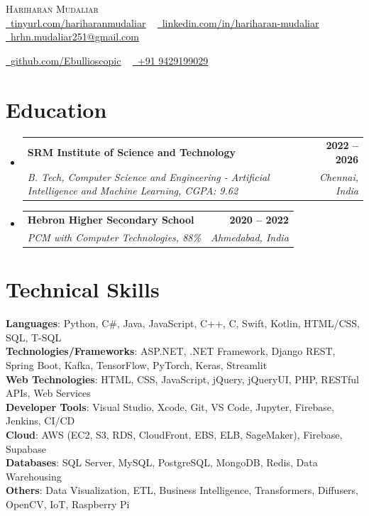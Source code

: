 \documentclass[letterpaper,11pt]{article}
\makeatletter
\newcommand{\resumeSubheading}[4]{
  \vspace{-2pt}\item
    \begin{tabular*}{1.0\textwidth}[t]{l@{\extracolsep{\fill}}r}
      \textbf{#1} & \textbf{\small #2} \\
      \textit{\small#3} & \textit{\small #4} \\
    \end{tabular*}\vspace{-7pt}
}
\newcommand{\resumeSubHeadingListStart}{\begin{itemize}[leftmargin=0.0in, label={}]}
\newcommand{\resumeSubHeadingListEnd}{\end{itemize}}
\makeatother
\begin{document}
\begin{center}
    {\Huge \scshape Hariharan Mudaliar} \\ \vspace{1pt}
    \href{https://tinyurl.com/hariharanmudaliar}{\raisebox{-0.2\height}\faLink\ \underline{tinyurl.com/hariharanmudaliar}} ~
    \href{https://linkedin.com/in/hariharan-mudaliar}{\raisebox{-0.2\height}\faLinkedin\ \underline{linkedin.com/in/hariharan-mudaliar}} ~
    \href{mailto:hrhn.mudaliar251@gmail.com}{\raisebox{-0.2\height}\faEnvelope\ \underline{hrhn.mudaliar251@gmail.com}} ~
    
    \href{https://github.com/Ebullioscopic}{\raisebox{-0.2\height}\faGithub\ \underline{github.com/Ebullioscopic}} ~
    \href{tel:+919429199029}{\raisebox{-0.2\height}\faPhone\ +91 9429199029}
\end{center}

\section{Education}
\resumeSubHeadingListStart
  \resumeSubheading
    {SRM Institute of Science and Technology}{2022 -- 2026}
    {B. Tech, Computer Science and Engineering - Artificial Intelligence and Machine Learning, CGPA: 9.62}{Chennai, India}
\resumeSubHeadingListEnd

\resumeSubHeadingListStart
  \resumeSubheading
    {Hebron Higher Secondary School}{2020 -- 2022}
    {PCM with Computer Technologies, 88\%}{Ahmedabad, India}
\resumeSubHeadingListEnd


\section{Technical Skills}
 \begin{itemize}[leftmargin=0.15in, label={}]
    \small{\item{
     \textbf{Languages}{: Python, C\#, Java, JavaScript, C++, C, Swift, Kotlin, HTML/CSS, SQL, T-SQL} \\
     \textbf{Technologies/Frameworks}{: ASP.NET, .NET Framework, Django REST, Spring Boot, Kafka, TensorFlow, PyTorch, Keras, Streamlit} \\
     \textbf{Web Technologies}{: HTML, CSS, JavaScript, jQuery, jQueryUI, PHP, RESTful APIs, Web Services} \\
     \textbf{Developer Tools}{: Visual Studio, Xcode, Git, VS Code, Jupyter, Firebase, Jenkins, CI/CD} \\
     \textbf{Cloud}{: AWS (EC2, S3, RDS, CloudFront, EBS, ELB, SageMaker), Firebase, Supabase} \\
     \textbf{Databases}{: SQL Server, MySQL, PostgreSQL, MongoDB, Redis, Data Warehousing} \\
     \textbf{Others}{: Data Visualization, ETL, Business Intelligence, Transformers, Diffusers, OpenCV, IoT, Raspberry Pi} \\
    }}
 \end{itemize}
\end{document}
